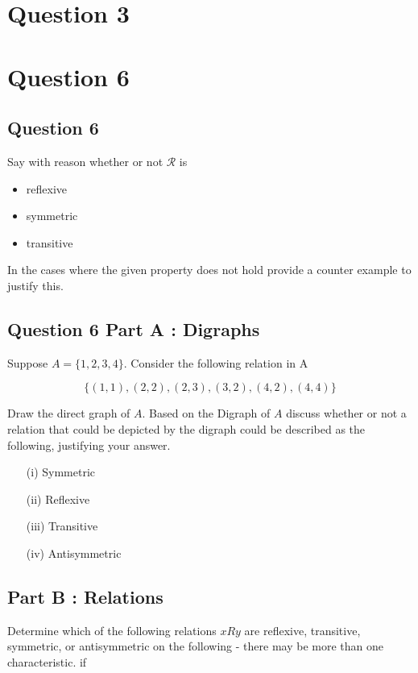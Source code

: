 \documentclass[]{report}
\begin{document}
\newpage
\section*{Question 3}





\section*{Question 6}

\subsection{Question 6}
Say with reason whether or not $\mathcal{R}$ is
\begin{itemize}
	\item reflexive
	\item symmetric
	\item transitive
\end{itemize}

In the cases where the given property does not hold provide a counter example to justify this.

	
	\subsection*{Question 6 Part A : Digraphs}
	
	Suppose $A = $$\{1,2,3,4\}$. Consider the following relation in A
	
	\[ \{  (1,1),(2,2),(2,3),(3,2),(4,2),(4,4)\} \]
	
	Draw the direct graph of $A$. Based on the Digraph of $A$ discuss whether or not a relation that could be depicted by the digraph could be described as the following, justifying your answer.
	
	
	\begin{itemize}
		\item[(i)] Symmetric
		\item[(ii)] Reflexive 
		\item[(iii)] Transitive
		\item[(iv)] Antisymmetric
	\end{itemize}
	\subsection*{Part B : Relations}
	Determine which of the following relations $ x R y$ are reflexive, transitive, symmetric, or antisymmetric on the following - there may be more than one characteristic.  if
	
\end{document}
